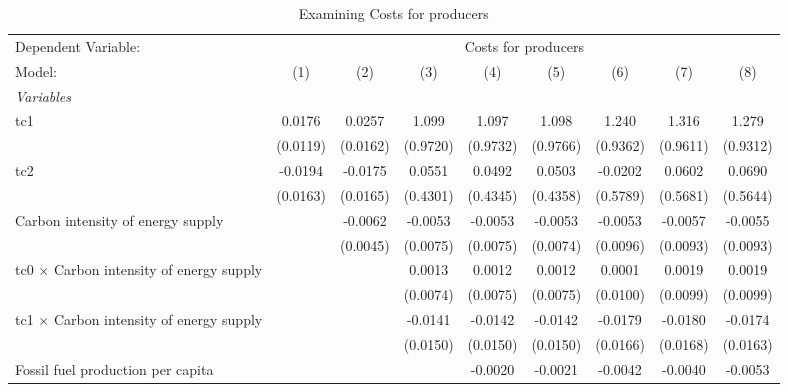 
\begin{table}[htbp]
   \caption{Examining Costs for producers}
   \centering
   \begin{tabular}{lcccccccc}
      \tabularnewline \midrule \midrule
      Dependent Variable: & \multicolumn{8}{c}{Costs for producers}\\
      Model:                                          & (1)      & (2)      & (3)      & (4)      & (5)      & (6)      & (7)      & (8)\\  
      \midrule
      \emph{Variables}\\
      tc1                                             & 0.0176   & 0.0257   & 1.099    & 1.097    & 1.098    & 1.240    & 1.316    & 1.279\\   
                                                      & (0.0119) & (0.0162) & (0.9720) & (0.9732) & (0.9766) & (0.9362) & (0.9611) & (0.9312)\\   
      tc2                                             & -0.0194  & -0.0175  & 0.0551   & 0.0492   & 0.0503   & -0.0202  & 0.0602   & 0.0690\\   
                                                      & (0.0163) & (0.0165) & (0.4301) & (0.4345) & (0.4358) & (0.5789) & (0.5681) & (0.5644)\\   
      Carbon intensity of energy supply               &          & -0.0062  & -0.0053  & -0.0053  & -0.0053  & -0.0053  & -0.0057  & -0.0055\\   
                                                      &          & (0.0045) & (0.0075) & (0.0075) & (0.0074) & (0.0096) & (0.0093) & (0.0093)\\   
      tc0 $\times$ Carbon intensity of energy supply  &          &          & 0.0013   & 0.0012   & 0.0012   & 0.0001   & 0.0019   & 0.0019\\   
                                                      &          &          & (0.0074) & (0.0075) & (0.0075) & (0.0100) & (0.0099) & (0.0099)\\   
      tc1 $\times$ Carbon intensity of energy supply  &          &          & -0.0141  & -0.0142  & -0.0142  & -0.0179  & -0.0180  & -0.0174\\   
                                                      &          &          & (0.0150) & (0.0150) & (0.0150) & (0.0166) & (0.0168) & (0.0163)\\   
      Fossil fuel production per capita               &          &          &          & -0.0020  & -0.0021  & -0.0042  & -0.0040  & -0.0053\\   

\end{tabular}
\end{table}
